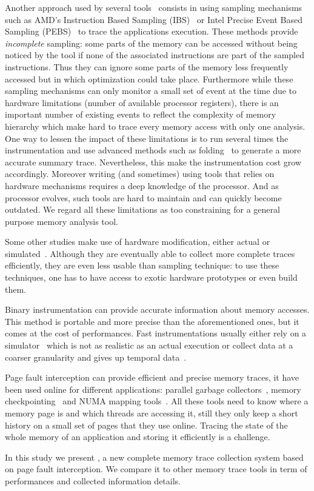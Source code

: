 Another approach used by several
tools~\cite{Lachaize12MemProf,McCurdy10Memphis,Liu14Tool,Gimenez14Dissecting}
consists in using sampling mechanisms such as AMD's Instruction Based Sampling
(IBS)~\cite{Drongowski07Instructionbased} or Intel Precise Event Based
Sampling (PEBS)~\cite{Levinthal2009} to trace the applications execution. These methods
provide \emph{incomplete} sampling: some parts of the memory can be accessed without
being noticed by the tool if none of the associated instructions are part of the sampled
instructions.
Thus they can ignore some parts of the memory less frequently accessed but in which
optimization could take place.
Furthermore while these sampling mechanisms can only monitor a small set of event
at the time due to hardware limitations (number of available processor
registers), there is an important number of existing events to reflect the
complexity of memory hierarchy which make hard to trace every memory
access with only one analysis.
One way to lessen the impact of these limitations is to run several times the
instrumentation and use advanced methods such as
folding~\cite{Servat15Towards} to generate a more accurate summary trace.
Nevertheless, this make the instrumentation cost grow accordingly.
Moreover writing (and sometimes) using tools that relies on hardware mechanisms
requires a deep knowledge of the processor. And as processor evolves,
such tools are hard to maintain and can quickly become outdated.
We regard all these limitations as too constraining for a general purpose
memory analysis tool.

Some other studies make use of hardware modification, either actual or
simulated~\cite{Bao08HMTT,Martonosi92MemSpy}.  Although they are eventually able to collect
more complete traces efficiently, they are even less usable than sampling technique: to use
these techniques, one has to have access to exotic hardware prototypes or even build them.

Binary instrumentation can provide accurate information about memory accesses.
This method is portable and  more precise than the aforementioned ones,
but it comes at the cost of performances. Fast
instrumentations usually either rely on a simulator~\cite{DeRose02SIGMA} which is not as realistic as an actual execution
or collect data at a coarser granularity and gives up temporal
data~\cite{Beniamine15TABARNAC}.


Page fault interception can provide efficient and precise memory traces, it
have been used online for different applications: parallel garbage
collectors~\cite{Boehm91Mostly}, memory
checkpointing~\cite{Heo05Spaceefficient} and NUMA mapping
tools~\cite{Diener13CommunicationBased}. All these tools need to know where a
memory page is and which threads are accessing it, still they only keep a
short history on a small set of pages that they use online. Tracing the state
of the whole memory of an application and storing it efficiently is a
challenge.

In this study we present \Moca, a new complete memory trace collection system based on page
fault interception. We compare it to other memory trace tools in term of
performances and collected information details.
